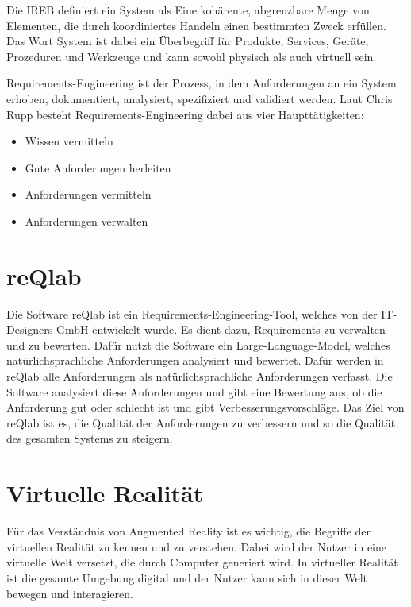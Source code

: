 
    Die IREB definiert ein System als \glqq{}Eine kohärente, abgrenzbare Menge von Elementen, die durch koordiniertes Handeln einen bestimmten Zweck erfüllen.\grqq{} \autocite[][]{ireb_cpre_glossary}
    Das Wort System ist dabei ein Überbegriff für Produkte, Services, Geräte, Prozeduren und Werkzeuge und kann sowohl physisch als auch virtuell sein.


    Requirements-Engineering ist der Prozess, in dem Anforderungen an ein System erhoben, dokumentiert, analysiert, spezifiziert und validiert werden.
    Laut Chris Rupp besteht Requirements-Engineering dabei aus vier Haupttätigkeiten:
    \begin{itemize}
        \item Wissen vermitteln
        \item Gute Anforderungen herleiten
        \item Anforderungen vermitteln
        \item Anforderungen verwalten
    \end{itemize}
    \autocite[][S.20]{Rupp2014}

  \section{reQlab}

  Die Software reQlab ist ein Requirements-Engineering-Tool, welches von der IT-Designers GmbH entwickelt wurde.
  Es dient dazu, Requirements zu verwalten und zu bewerten.
  Dafür nutzt die Software ein Large-Language-Model, welches natürlichsprachliche Anforderungen analysiert und bewertet.
  Dafür werden in reQlab alle Anforderungen als natürlichsprachliche Anforderungen verfasst.
  Die Software analysiert diese Anforderungen und gibt eine Bewertung aus, ob die Anforderung gut oder schlecht ist und gibt Verbesserungsvorschläge.
  Das Ziel von reQlab ist es, die Qualität der Anforderungen zu verbessern und so die Qualität des gesamten Systems zu steigern.


  \section{Virtuelle Realität}
  Für das Verständnis von Augmented Reality ist es wichtig, die Begriffe der virtuellen Realität zu kennen und zu verstehen.
  Dabei wird der Nutzer in eine virtuelle Welt versetzt, die durch Computer generiert wird.
  In virtueller Realität ist die gesamte Umgebung digital und der Nutzer kann sich in dieser Welt bewegen und interagieren.
  \autocite[vgl.][S.14]{Dalton2023}

